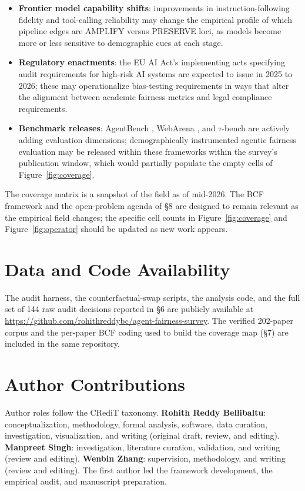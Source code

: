 \documentclass[acmsmall,nonacm]{acmart}
\begin{document}
\begin{itemize}
\item \textbf{Frontier model capability shifts}: improvements in instruction-following fidelity and tool-calling reliability may change the empirical profile of which pipeline edges are AMPLIFY versus PRESERVE loci, as models become more or less sensitive to demographic cues at each stage.
\item \textbf{Regulatory enactments}: the EU AI Act's implementing acts specifying audit requirements for high-risk AI systems are expected to issue in 2025 to 2026; these may operationalize bias-testing requirements in ways that alter the alignment between academic fairness metrics and legal compliance requirements.
\item \textbf{Benchmark releases}: AgentBench \cite{liu2024agentbench}, WebArena \cite{zhou2024webarena}, and $\tau$-bench are actively adding evaluation dimensions; demographically instrumented agentic fairness evaluation may be released within these frameworks within the survey's publication window, which would partially populate the empty cells of Figure~\ref{fig:coverage}.
\end{itemize}

The coverage matrix is a snapshot of the field as of mid-2026. The BCF framework and the open-problem agenda of \S{}8 are designed to remain relevant as the empirical field changes; the specific cell counts in Figure~\ref{fig:coverage} and Figure~\ref{fig:operator} should be updated as new work appears.

\section*{Data and Code Availability}

The audit harness, the counterfactual-swap scripts, the analysis code, and the full set of 144 raw audit decisions reported in \S{}6 are publicly available at \url{https://github.com/rohithreddybc/agent-fairness-survey}. The verified 202-paper corpus and the per-paper BCF coding used to build the coverage map (\S{}7) are included in the same repository.

\section*{Author Contributions}

Author roles follow the CRediT taxonomy. \textbf{Rohith Reddy Bellibaltu}: conceptualization, methodology, formal analysis, software, data curation, investigation, visualization, and writing (original draft, review, and editing). \textbf{Manpreet Singh}: investigation, literature curation, validation, and writing (review and editing). \textbf{Wenbin Zhang}: supervision, methodology, and writing (review and editing). The first author led the framework development, the empirical audit, and manuscript preparation.
\end{document}
